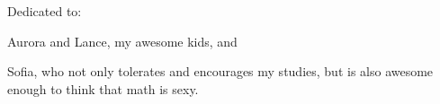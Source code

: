 %
%
\thispagestyle{empty}
{}

\vspace*{3cm}

%

\begin{center}
    Dedicated to:

\par
    Aurora and Lance, my awesome kids, and

\par
    Sofia, who not only tolerates and encourages my studies, but is also awesome enough to think that math is sexy.
\end{center}
